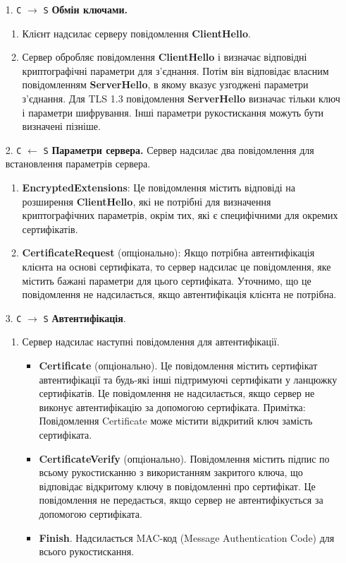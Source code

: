 \begin{enumerate}
    \item[1. \texttt{С} $\longrightarrow$ \texttt{S}] \textbf{Обмін ключами.}
    \begin{enumerate}
        \item Клієнт надсилає серверу повідомлення \textbf{ClientHello}.
        \item Сервер обробляє повідомлення \textbf{ClientHello} і визначає відповідні криптографічні параметри для з'єднання. Потім він відповідає власним повідомленням \textbf{ServerHello}, в якому вказує узгоджені параметри з'єднання. Для TLS 1.3 повідомлення \textbf{ServerHello} визначає тільки ключ і параметри шифрування. Інші параметри рукостискання можуть бути визначені пізніше.
    \end{enumerate}
        
    \item[2. \texttt{С} $\longleftarrow$ \texttt{S}] \textbf{Параметри сервера.} Сервер надсилає два повідомлення для встановлення параметрів сервера.
    \begin{enumerate}
        \item \textbf{EncryptedExtensions}: Це повідомлення містить відповіді на розширення \textbf{ClientHello}, які не потрібні для визначення криптографічних параметрів, окрім тих, які є специфічними для окремих сертифікатів.
        \item \textbf{CertificateRequest} (опціонально): Якщо потрібна автентифікація клієнта на основі сертифіката, то сервер надсилає це повідомлення, яке містить бажані параметри для цього сертифіката. Уточнимо, що це повідомлення не надсилається, якщо автентифікація клієнта не потрібна.
    \end{enumerate}
    
    \item[3. \texttt{С} $\longrightarrow$ \texttt{S}] \textbf{Автентифікація}.
    \begin{enumerate}
        \item
              Сервер надсилає наступні повідомлення для автентифікації.
              \begin{itemize}
                \item \textbf{Certificate} (опціонально). Це повідомлення містить сертифікат автентифікації та будь-які інші підтримуючі сертифікати у ланцюжку сертифікатів. Це повідомлення не надсилається, якщо сервер не виконує автентифікацію за допомогою сертифіката. Примітка: Повідомлення Certificate може містити відкритий ключ замість сертифіката.
                \item \textbf{CertificateVerify} (опціонально). Повідомлення містить підпис по всьому рукостисканню з використанням закритого ключа, що відповідає відкритому ключу в повідомленні про сертифікат. Це повідомлення не передається, якщо сервер не автентифікується за допомогою сертифіката.
                \item \textbf{Finish}. Надсилається MAC-код (Message Authentication Code) для всього рукостискання.
              \end{itemize}
              

\end{enumerate}
\end{enumerate}

